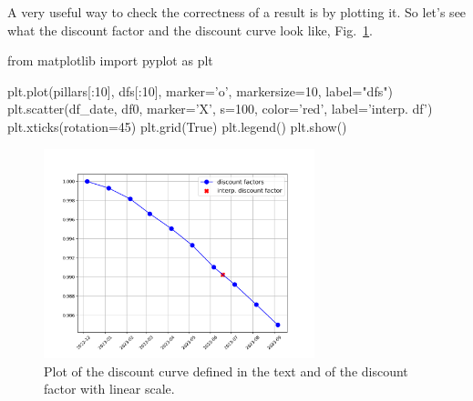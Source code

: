 A very useful way to check the correctness of a result is by plotting it. So let's see what the discount factor and the discount curve look like, Fig.~\ref{fig:linear_discount_curve}.

\begin{ipython}
from matplotlib import pyplot as plt

plt.plot(pillars[:10], dfs[:10], marker='o', markersize=10, 
         label="dfs")
plt.scatter(df_date, df0, marker='X', s=100, color='red', 
            label='interp. df')
plt.xticks(rotation=45)
plt.grid(True)
plt.legend()
plt.show()
\end{ipython}


\begin{figure}[htb]
	\centering
	\includegraphics[width=0.7\textwidth]{figures/linear_discount_curve}
	\caption{Plot of the discount curve defined in the text and of the discount factor with linear scale.}
	\label{fig:linear_discount_curve}
\end{figure}

